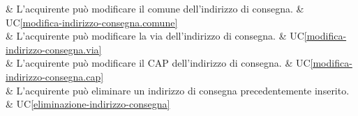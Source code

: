  & L'acquirente può modificare il comune dell'indirizzo di consegna. & UC\ref{modifica-indirizzo-consegna.comune} \\

 & L'acquirente può modificare la via dell'indirizzo di consegna. & UC\ref{modifica-indirizzo-consegna.via} \\

 & L'acquirente può modificare il CAP dell'indirizzo di consegna. & UC\ref{modifica-indirizzo-consegna.cap} \\

 & L'acquirente può eliminare un indirizzo di consegna precedentemente inserito. & UC\ref{eliminazione-indirizzo-consegna} \\


